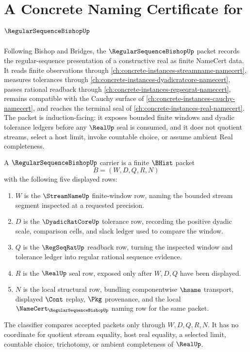 \chapter{A Concrete Naming Certificate for $\RegularSequenceBishopUp$}
\label{ch:concrete-instances-regular-sequence-bishop-namecert}

Following Bishop and Bridges, the $\RegularSequenceBishopUp$ packet records the regular-sequence presentation of a constructive real as finite NameCert data. It reads finite observations through \autoref{ch:concrete-instances-streamname-namecert}, measures tolerances through \autoref{ch:concrete-instances-dyadicratcore-namecert}, passes rational readback through \autoref{ch:concrete-instances-regseqrat-namecert}, remains compatible with the Cauchy surface of \autoref{ch:concrete-instances-cauchy-namecert}, and reaches the terminal seal of \autoref{ch:concrete-instances-real-namecert}. The packet is induction-facing: it exposes bounded finite windows and dyadic tolerance ledgers before any $\RealUp$ seal is consumed, and it does not quotient streams, select a host limit, invoke countable choice, or assume ambient Real completeness.

\begin{definition}
\label{def:regular-sequence-bishop-carrier}
A $\RegularSequenceBishopUp$ carrier is a finite $\BHist$ packet
$$
B=(W,D,Q,R,N)
$$
with the following five displayed rows:
\begin{enumerate}
\item $W$ is the $\StreamNameUp$ finite-window row, naming the bounded stream segment inspected at a requested precision.
\item $D$ is the $\DyadicRatCoreUp$ tolerance row, recording the positive dyadic scale, comparison cells, and slack ledger used to compare the window.
\item $Q$ is the $\RegSeqRatUp$ readback row, turning the inspected window and tolerance ledger into regular rational sequence evidence.
\item $R$ is the $\RealUp$ seal row, exposed only after $W,D,Q$ have been displayed.
\item $N$ is the local structural row, bundling componentwise $\hsame$ transport, displayed $\Cont$ replay, $\Pkg$ provenance, and the local $\NameCert_{\RegularSequenceBishopUp}$ naming row for the same packet.
\end{enumerate}
The classifier compares accepted packets only through $W,D,Q,R,N$. It has no coordinate for quotient stream equality, host real equality, a selected limit, countable choice, trichotomy, or ambient completeness of $\RealUp$.
\end{definition}

